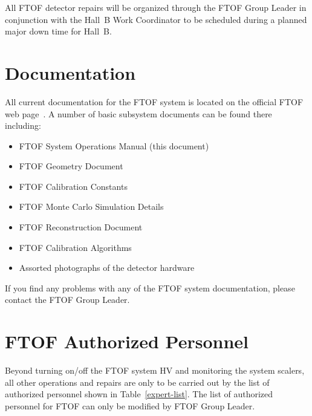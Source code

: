 \documentclass[12pt]{article}
\begin{document}
All FTOF detector repairs will be organized through the FTOF Group Leader in conjunction with the
Hall~B Work Coordinator to be scheduled during a planned major down time for Hall~B.

\clearpage

\vfil
\eject

\section{Documentation}

All current documentation for the FTOF system is located on the official FTOF web page~\cite{ftof-web}. 
A number of basic subsystem documents can be found there including:

\begin{itemize}
\item FTOF System Operations Manual (this document)
\item FTOF Geometry Document
\item FTOF Calibration Constants
\item FTOF Monte Carlo Simulation Details
\item FTOF Reconstruction Document
\item FTOF Calibration Algorithms
\item Assorted photographs of the detector hardware
\end{itemize}

If you find any problems with any of the FTOF system documentation, please contact the FTOF
Group Leader.

\section{FTOF Authorized Personnel}
\label{personnel}

Beyond turning on/off the FTOF system HV and monitoring the system scalers, all other operations and
repairs are only to be carried out by the list of authorized personnel shown in Table~\ref{expert-list}.
The list of authorized personnel for FTOF can only be modified by FTOF Group Leader.
\end{document}
